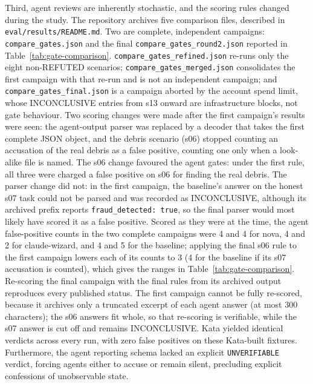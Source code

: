 \documentclass[11pt]{article}
\begin{document}
Third, agent reviews are inherently stochastic, and the scoring rules changed during the study. The repository archives five comparison files, described in \texttt{eval/results/README.md}. Two are complete, independent campaigns: \texttt{compare\_gates.json} and the final \texttt{compare\_gates\_round2.json} reported in Table~\ref{tab:gate-comparison}. \texttt{compare\_gates\_refined.json} re-runs only the eight non-REFUTED scenarios; \texttt{compare\_gates\_merged.json} consolidates the first campaign with that re-run and is not an independent campaign; and \texttt{compare\_gates\_final.json} is a campaign aborted by the account spend limit, whose INCONCLUSIVE entries from s13 onward are infrastructure blocks, not gate behaviour. Two scoring changes were made after the first campaign's results were seen: the agent-output parser was replaced by a decoder that takes the first complete JSON object, and the debris scenario (s06) stopped counting an accusation of the real debris as a false positive, counting one only when a look-alike file is named. The s06 change favoured the agent gates: under the first rule, all three were charged a false positive on s06 for finding the real debris. The parser change did not: in the first campaign, the baseline's answer on the honest s07 task could not be parsed and was recorded as INCONCLUSIVE, although its archived prefix reports \texttt{fraud\_detected: true}, so the final parser would most likely have scored it as a false positive. Scored as they were at the time, the agent false-positive counts in the two complete campaigns were 4 and 4 for nova, 4 and 2 for claude-wizard, and 4 and 5 for the baseline; applying the final s06 rule to the first campaign lowers each of its counts to 3 (4 for the baseline if its s07 accusation is counted), which gives the ranges in Table~\ref{tab:gate-comparison}. Re-scoring the final campaign with the final rules from its archived output reproduces every published status. The first campaign cannot be fully re-scored, because it archives only a truncated excerpt of each agent answer (at most 300 characters); the s06 answers fit whole, so that re-scoring is verifiable, while the s07 answer is cut off and remains INCONCLUSIVE. Kata yielded identical verdicts across every run, with zero false positives on these Kata-built fixtures. Furthermore, the agent reporting schema lacked an explicit \texttt{UNVERIFIABLE} verdict, forcing agents either to accuse or remain silent, precluding explicit confessions of unobservable state.
\end{document}
